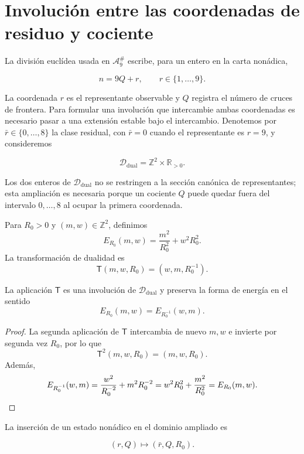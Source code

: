 \section{Involución entre las coordenadas de residuo y cociente}
\label{sec:dualidad-visible-memoria}

La división euclídea usada en \(\mathcal A_9^\#\) escribe, para un entero en
la carta nonádica,

\[
n=9Q+r,
\qquad r\in\{1,\ldots,9\}.
\]

La coordenada \(r\) es el representante observable y \(Q\) registra el
número de cruces de frontera. Para formular una involución que intercambie
ambas coordenadas es necesario pasar a una extensión estable bajo el
intercambio. Denotemos por \(\bar r\in\{0,\ldots,8\}\) la clase residual,
con \(\bar r=0\) cuando el representante es \(r=9\), y consideremos

\[
\mathscr D_{\mathrm{dual}}=\mathbb Z^2\times\mathbb R_{>0}.
\]

Los dos enteros de \(\mathscr D_{\mathrm{dual}}\) no se restringen a la sección canónica de
representantes; esta ampliación es necesaria porque un cociente \(Q\) puede
quedar fuera del intervalo \(0,\ldots,8\) al ocupar la primera coordenada.

\begin{definition}
Para \(R_0>0\) y \((m,w)\in\mathbb Z^2\), definimos
\[
E_{R_0}(m,w)=\frac{m^2}{R_0^2}+w^2R_0^2.
\]
La transformación de dualidad es
\[
\mathsf T(m,w,R_0)=(w,m,R_0^{-1}).
\]
\end{definition}

\begin{theorem}
\label{thm:dualidad-visible-memoria}
La aplicación \(\mathsf T\) es una involución de \(\mathscr D_{\mathrm{dual}}\) y preserva
la forma de energía en el sentido
\[
E_{R_0}(m,w)=E_{R_0^{-1}}(w,m).
\]
\end{theorem}

\begin{proof}
La segunda aplicación de \(\mathsf T\) intercambia de nuevo \(m,w\) e
invierte por segunda vez \(R_0\), por lo que
\[
\mathsf T^2(m,w,R_0)=(m,w,R_0).
\]
Además,
\[
E_{R_0^{-1}}(w,m)
=\frac{w^2}{R_0^{-2}}+m^2R_0^{-2}
=w^2R_0^2+\frac{m^2}{R_0^2}
=E_{R_0}(m,w).\qedhere
\]
\end{proof}

La inserción de un estado nonádico en el dominio ampliado es

\[
(r,Q)\longmapsto(\bar r,Q,R_0).
\]


